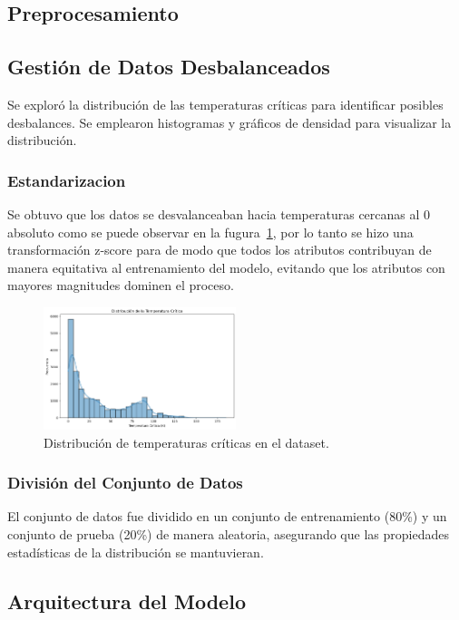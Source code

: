 \documentclass[conference]{IEEEtran} %
\begin{document}
\subsection{Preprocesamiento}

\subsection{Gestión de Datos Desbalanceados} Se exploró la distribución de 
las temperaturas críticas para identificar posibles desbalances. 
Se emplearon histogramas y gráficos de densidad para visualizar 
la distribución.

\subsubsection{Estandarizacion}
Se obtuvo que los datos se desvalanceaban hacia temperaturas 
cercanas al 0 absoluto como se puede observar en la fugura~\ref{fig:desvalance}, por lo tanto se hizo una transformación 
z-score para de modo que todos los atributos contribuyan de manera 
equitativa al entrenamiento del modelo, evitando que los atributos 
con mayores magnitudes dominen el proceso.

\begin{figure}[!h]
    \centering
    \includegraphics[width=0.5\textwidth]{Desvalance.png}
    \caption{Distribución de temperaturas críticas en el dataset.}
    \label{fig:desvalance}
\end{figure}

\subsubsection{División del Conjunto de Datos}
El conjunto de datos fue dividido 
en un conjunto de entrenamiento (80\%) y un conjunto de prueba 
(20\%) de manera aleatoria, asegurando que las propiedades 
estadísticas de la distribución se mantuvieran.

\subsection{Arquitectura del Modelo}
\end{document}
